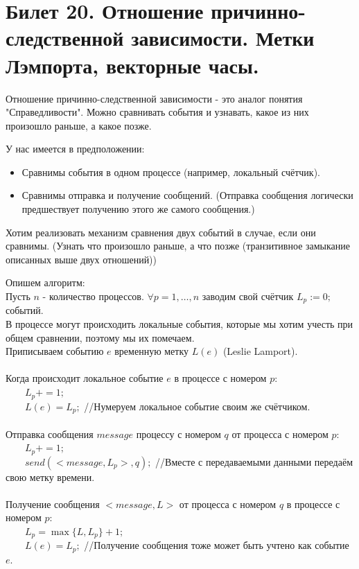 \newpage
\section{Билет 20. Отношение причинно-следственной зависимости. Метки Лэмпорта, векторные часы.}\label{b20}
Отношение причинно-следственной зависимости - это аналог понятия "Справедливости". Можно сравнивать события и узнавать, какое из них произошло раньше, а какое позже.

У нас имеется в предположении:
\begin{itemize}
\item Сравнимы события в одном процессе (например, локальный счётчик).
\item Сравнимы отправка и получение сообщений. (Отправка сообщения логически предшествует получению этого же самого сообщения.)
\end{itemize}
Хотим реализовать механизм сравнения двух событий в случае, если они сравнимы. (Узнать что произошло раньше, а что позже (транзитивное замыкание описанных выше двух отношений))

Опишем алгоритм:\\
Пусть $n$ - количество процессов. $\forall p = 1, \ldots, n$ заводим свой счётчик $L_p := 0;$ событий.\\
В процессе могут происходить локальные события, которые мы хотим учесть при общем сравнении, поэтому мы их помечаем.\\
Приписываем событию $e$ временную метку $L(e)$ (Leslie Lamport).\\ \\
Когда происходит локальное событие $e$ в процессе с номером $p$:\\
\ \ \ \ $L_p += 1;$\\
\ \ \ \ $L(e) = L_p;$ //Нумеруем локальное событие своим же счётчиком. \\ \\ 
Отправка сообщения $message$ процессу с номером $q$ от процесса с номером $p$:\\
\ \ \ \ $L_p += 1;$\\
\ \ \ \ $send(<message, L_p>, q);$ //Вместе с передаваемыми данными передаём свою метку времени.\\ \\
Получение сообщения $<message, L>$ от процесса с номером $q$ в  процессе с номером $p$:\\ 
\ \ \ \ $L_p = \max\{L,L_p\} + 1;$\\
\ \ \ \ $L(e) = L_p;$ //Получение сообщения тоже может быть учтено как событие $e$. \\

